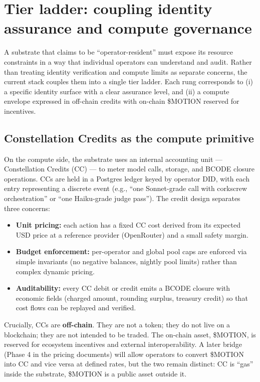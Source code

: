 \documentclass{article}
\providecommand{\tightlist}{\setlength{\itemsep}{0pt}\setlength{\parskip}{0pt}}
\begin{document}
\section{Tier ladder: coupling identity assurance and compute
governance}\label{tier-ladder-coupling-identity-assurance-and-compute-governance}

A substrate that claims to be ``operator-resident'' must expose its
resource constraints in a way that individual operators can understand
and audit. Rather than treating identity verification and compute limits
as separate concerns, the current stack couples them into a single tier
ladder. Each rung corresponds to (i) a specific identity surface with a
clear assurance level, and (ii) a compute envelope expressed in
off-chain credits with on-chain \$MOTION reserved for incentives.

\subsection{Constellation Credits as the compute
primitive}\label{constellation-credits-as-the-compute-primitive}

On the compute side, the substrate uses an internal accounting unit ---
Constellation Credits (CC) --- to meter model calls, storage, and BCODE
closure operations. CCs are held in a Postgres ledger keyed by operator
DID, with each entry representing a discrete event (e.g., ``one
Sonnet-grade call with corkscrew orchestration'' or ``one Haiku-grade
judge pass''). The credit design separates three concerns:

\begin{itemize}
\tightlist
\item
  \textbf{Unit pricing:} each action has a fixed CC cost derived from
  its expected USD price at a reference provider (OpenRouter) and a
  small safety margin.
\item
  \textbf{Budget enforcement:} per-operator and global pool caps are
  enforced via simple invariants (no negative balances, nightly pool
  limits) rather than complex dynamic pricing.
\item
  \textbf{Auditability:} every CC debit or credit emits a BCODE closure
  with economic fields (charged amount, rounding surplus, treasury
  credit) so that cost flows can be replayed and verified.
\end{itemize}

Crucially, CCs are \textbf{off-chain}. They are not a token; they do not
live on a blockchain; they are not intended to be traded. The on-chain
asset, \$MOTION, is reserved for ecosystem incentives and external
interoperability. A later bridge (Phase 4 in the pricing documents) will
allow operators to convert \$MOTION into CC and vice versa at defined
rates, but the two remain distinct: CC is ``gas'' inside the substrate,
\$MOTION is a public asset outside it.
\end{document}
